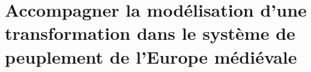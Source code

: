 \part{Accompagner la modélisation d'une transformation dans le système de peuplement de l'Europe médiévale}